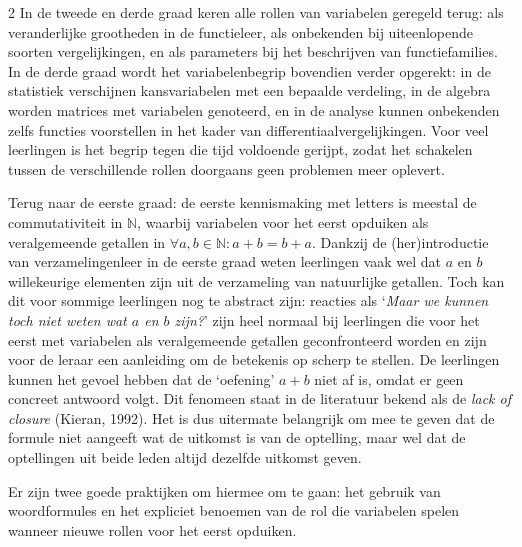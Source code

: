 \begin{multicols}{2}
In de tweede en derde graad keren alle rollen van variabelen geregeld terug: als veranderlijke grootheden in de functieleer, als onbekenden bij uiteenlopende soorten vergelijkingen, en als parameters bij het beschrijven van functiefamilies. In de derde graad wordt het variabelenbegrip bovendien verder opgerekt: in de statistiek verschijnen kansvariabelen met een bepaalde verdeling, in de algebra worden matrices met variabelen genoteerd, en in de analyse kunnen onbekenden zelfs functies voorstellen in het kader van differentiaalvergelijkingen. Voor veel leerlingen is het begrip tegen die tijd voldoende gerijpt, zodat het schakelen tussen de verschillende rollen doorgaans geen problemen meer oplevert.

Terug naar de eerste graad: de eerste kennismaking met letters is meestal de commutativiteit in $\mathbb{N}$, waarbij variabelen voor het eerst opduiken als veralgemeende getallen in $\forall a, b \in \mathbb{N}: a + b = b + a$. Dankzij de (her)introductie van verzamelingenleer in de eerste graad weten leerlingen vaak wel dat $a$ en $b$ willekeurige elementen zijn uit de verzameling van natuurlijke getallen. Toch kan dit voor sommige leerlingen nog te abstract zijn: reacties als `\textit{Maar we kunnen toch niet weten wat $a$ en $b$ zijn?}’ zijn heel normaal bij leerlingen die voor het eerst met variabelen als veralgemeende getallen geconfronteerd worden en zijn voor de leraar een aanleiding om de betekenis op scherp te stellen. De leerlingen kunnen het gevoel hebben dat de `oefening' $a + b$ niet af is, omdat er geen concreet antwoord volgt. Dit fenomeen staat in de literatuur bekend als de \textit{lack of closure} (Kieran, 1992). Het is dus uitermate belangrijk om mee te geven dat de formule niet aangeeft wat de uitkomst is van de optelling, maar wel dat de optellingen uit beide leden altijd dezelfde uitkomst geven.

Er zijn twee goede praktijken om hiermee om te gaan: het gebruik van woordformules en het expliciet benoemen van de rol die variabelen spelen wanneer nieuwe rollen voor het eerst opduiken.


\end{multicols}
